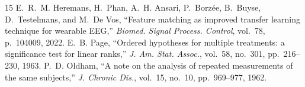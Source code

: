 \documentclass[journal]{IEEEtran}
\begin{document}
\begin{thebibliography}{15}
 E.~R.~M. Heremans, H.~Phan, A.~H. Ansari, P.~Borz\'ee, B.~Buyse, D.~Testelmans, and M.~De Vos, ``Feature matching as improved transfer learning technique for wearable EEG,'' \textit{Biomed. Signal Process. Control}, vol.~78, p.~104009, 2022.
 E.~B. Page, ``Ordered hypotheses for multiple treatments: a significance test for linear ranks,'' \textit{J. Am. Stat. Assoc.}, vol.~58, no.~301, pp.~216--230, 1963.
 P.~D. Oldham, ``A note on the analysis of repeated measurements of the same subjects,'' \textit{J. Chronic Dis.}, vol.~15, no.~10, pp.~969--977, 1962.
\end{thebibliography}
\end{document}

